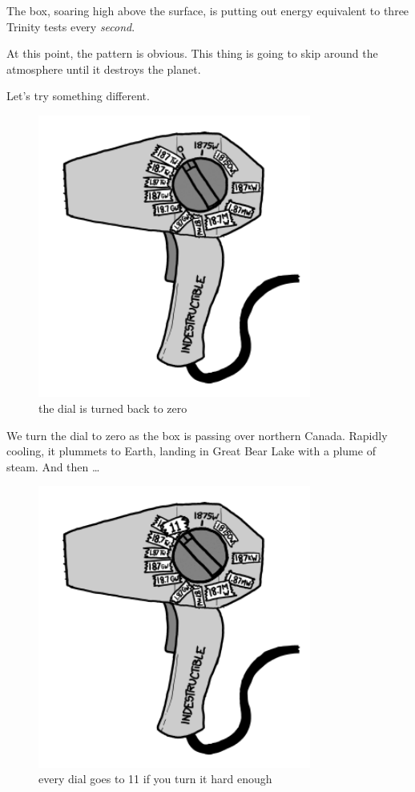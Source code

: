 {The box, soaring high above the surface, is putting out energy equivalent to three Trinity tests every \emph{second}.}

{At this point, the pattern is obvious. This thing is going to skip around the atmosphere until it destroys the planet.}

{Let's try something different.}

\begin{figure}[!htbp]
\centering
\includegraphics[scale=0.5, max width=0.8\textwidth]{imgs/a/35/hair_dryer_0.png}
\caption{the dial is turned back to zero}
\end{figure}

{We turn the dial to zero as the box is passing over northern Canada. Rapidly cooling, it plummets to Earth, landing in Great Bear Lake with a plume of steam. And then …}

\begin{figure}[!htbp]
\centering
\includegraphics[scale=0.5, max width=0.8\textwidth]{imgs/a/35/hair_dryer_1e16.png}
\caption{every dial goes to 11 if you turn it hard enough}
\end{figure}


